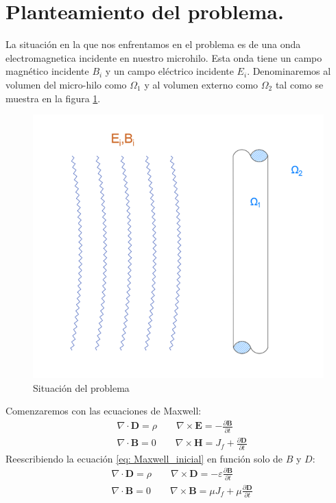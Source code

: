 \documentclass[11pt]{article}
\begin{document}
\section{Planteamiento del problema.}\label{sec:Planteamiento del problema.}
\setcounter{figure}{0}
\setcounter{equation}{0}
La situación en la que nos enfrentamos en el problema es de una onda electromagnetica incidente en nuestro microhilo. Esta onda tiene un campo magnético incidente $B_i$ y un campo eléctrico incidente $E_i$. Denominaremos al volumen del micro-hilo como $\Omega_1$ y al volumen externo como $\Omega_2$ tal como se muestra en la figura \ref{fig:Representacion del problema}.
\begin{figure}[H]
\centering
\includegraphics[width=12cm]{Imagenes/ondaincidente.png}
\caption{Situación del problema} \label{fig:Representacion del problema}
\end{figure}
Comenzaremos con las ecuaciones de Maxwell:
\begin{equation}
\begin{split}
&\nabla\cdot\textbf{D} = \rho\qquad\nabla\times\textbf{E} = -\frac{\partial\textbf{B}}{\partial t}\\
&\nabla\cdot\textbf{B} = 0\qquad\nabla\times\textbf{H} = J_f+\frac{\partial\textbf{D}}{\partial t}
\end{split}
\label{eq: Maxwell_inicial}
\end{equation}
Reescribiendo la ecuación \eqref{eq: Maxwell_inicial} en función solo de $B$ y $D$:
\begin{equation}
\begin{split}
&\nabla\cdot\textbf{D} = \rho\qquad \nabla\times\textbf{D} = -\varepsilon\frac{\partial\textbf{B}}{\partial t}\\
&\nabla\cdot\textbf{B} = 0\qquad\nabla\times\textbf{B} = \mu J_f+\mu\frac{\partial\textbf{D}}{\partial t}
\end{split}
\label{eq: Maxwell_soloBD}
\end{equation}
\end{document}
